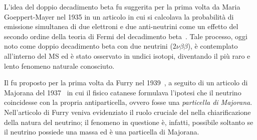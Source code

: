 L'idea del doppio decadimento beta fu suggerita per la prima volta da Maria Goeppert-Mayer nel 1935 in un articolo in cui si calcolava la probabilità di emissione simultanea di due elettroni e due anti-neutrini come un effetto del secondo ordine della teoria di Fermi del decadimento beta~\cite{goeppert-mayer:pr35}. 
Tale processo, oggi noto come doppio decadimento beta con due neutrini ($ 2\nu\beta\beta $), è contemplato all'interno del MS ed è stato osservato in undici isotopi, diventando il più raro e lento fenomeno naturale conosciuto.
 


Il \doppiobeta{} fu proposto per la prima volta da Furry nel 1939~\cite{furry:pr39}, a seguito di un articolo di Majorana del 1937~\cite{majorana:nc37} in cui il fisico catanese formulava l'ipotesi che il neutrino coincidesse con la propria antiparticella, ovvero fosse una \emph{particella di Majorana}. 
Nell'articolo di Furry veniva evidenziato il ruolo cruciale del \doppiobeta{} nella chiarificazione della natura del neutrino; il fenomeno in questione è, infatti, possibile soltanto se il neutrino possiede una massa ed è una particella di Majorana. 




